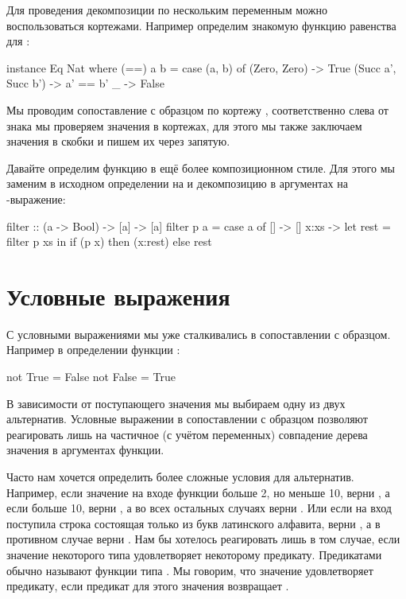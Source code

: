 Для проведения декомпозиции по нескольким переменным можно
воспользоваться кортежами. 
Например определим знакомую функцию равенства для :

\begin{code}
instance Eq Nat where
    (==) a b =
        case (a, b) of
            (Zero,    Zero)     -> True
            (Succ a', Succ b')  -> a' == b'
            _                   -> False
\end{code}

Мы проводим сопоставление с образцом по кортежу ,
соответственно слева от знака \In{->} мы проверяем значения в 
кортежах, для этого мы также заключаем значения в скобки
и пишем их через запятую.

Давайте определим функцию  в ещё более 
композиционном стиле. Для этого мы заменим в исходном 
определении  на  и декомпозицию в аргументах
на -выражение:

\begin{code}
filter :: (a -> Bool) -> [a] -> [a]
filter  p  a = 
    case a of
        []      -> []
        x:xs    ->  let rest = filter p xs
                    in  if (p x) 
                        then (x:rest)
                        else rest
\end{code}


\section{Условные выражения}

С условными выражениями мы уже сталкивались в сопоставлении с образцом.
Например в определении функции :

\begin{code}
not True  = False
not False = True
\end{code}

В зависимости от поступающего значения мы выбираем одну из двух
альтернатив. Условные выражении в сопоставлении с образцом позволяют
реагировать лишь на частичное (с учётом переменных) совпадение дерева
значения в аргументах функции. 

Часто нам хочется определить более сложные
условия для альтернатив. Например, если значение на входе функции
больше 2, но меньше 10, верни , а если больше 10, верни ,
а во всех остальных случаях верни . 
Или если на вход поступила строка состоящая только из букв
латинского алфавита, верни , а в противном случае верни
. Нам бы хотелось реагировать лишь в том случае, если значение 
некоторого типа  удовлетворяет некоторому предикату. 
Предикатами обычно называют функции типа .
Мы говорим, что значение удовлетворяет предикату, если предикат
для этого значения возвращает . 

